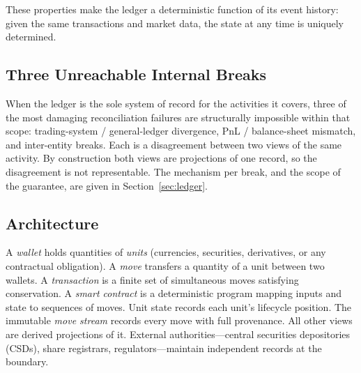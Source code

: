 These properties make the ledger a deterministic function of its event history: given the same transactions and market data, the state at any time is uniquely determined.

\subsection{Three Unreachable Internal Breaks}

When the ledger is the sole system of record for the activities it covers, three of the most damaging reconciliation failures are structurally impossible within that scope: trading-system / general-ledger divergence, PnL / balance-sheet mismatch, and inter-entity breaks. Each is a disagreement between two views of the same activity. By construction both views are projections of one record, so the disagreement is not representable. The mechanism per break, and the scope of the guarantee, are given in Section~\ref{sec:ledger}.

\subsection{Architecture}

A \textit{wallet} holds quantities of \textit{units} (currencies, securities, derivatives, or any contractual obligation). A \textit{move} transfers a quantity of a unit between two wallets. A \textit{transaction} is a finite set of simultaneous moves satisfying conservation. A \textit{smart contract} is a deterministic program mapping inputs and state to sequences of moves. Unit state records each unit's lifecycle position. The immutable \textit{move stream} records every move with full provenance. All other views are derived projections of it. External authorities---central securities depositories (CSDs), share registrars, regulators---maintain independent records at the boundary.

